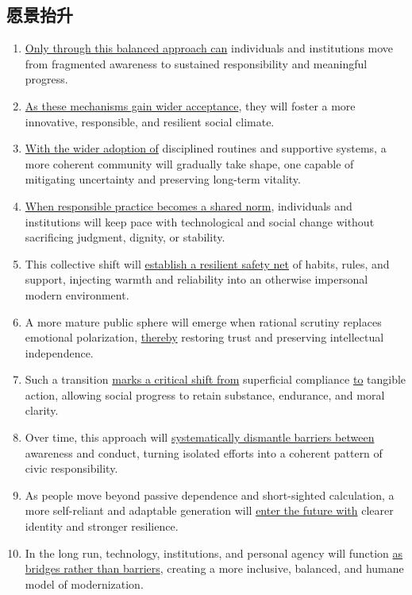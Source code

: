 \subsection{愿景抬升}

\begin{enumerate}
    \item \underline{Only through this balanced approach can} individuals and institutions move from fragmented awareness to sustained responsibility and meaningful progress.

    \item \underline{As these mechanisms gain wider acceptance}, they will foster a more innovative, responsible, and resilient social climate.

    \item \underline{With the wider adoption of} disciplined routines and supportive systems, a more coherent community will gradually take shape, one capable of mitigating uncertainty and preserving long-term vitality.

    \item \underline{When responsible practice becomes a shared norm}, individuals and institutions will keep pace with technological and social change without sacrificing judgment, dignity, or stability.

    \item This collective shift will \underline{establish a resilient safety net} of habits, rules, and support, injecting warmth and reliability into an otherwise impersonal modern environment.

    \item A more mature public sphere will emerge when rational scrutiny replaces emotional polarization, \underline{thereby} restoring trust and preserving intellectual independence.

    \item Such a transition \underline{marks a critical shift from} superficial compliance \underline{to} tangible action, allowing social progress to retain substance, endurance, and moral clarity.

    \item Over time, this approach will \underline{systematically dismantle barriers between} awareness and conduct, turning isolated efforts into a coherent pattern of civic responsibility.

    \item As people move beyond passive dependence and short-sighted calculation, a more self-reliant and adaptable generation will \underline{enter the future with} clearer identity and stronger resilience.

    \item In the long run, technology, institutions, and personal agency will function \underline{as bridges rather than barriers}, creating a more inclusive, balanced, and humane model of modernization.
\end{enumerate}